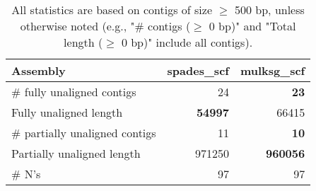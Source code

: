 \documentclass[12pt,a4paper]{article}
\begin{document}
\begin{table}[ht]
\begin{center}
\caption{All statistics are based on contigs of size $\geq$ 500 bp, unless otherwise noted (e.g., "\# contigs ($\geq$ 0 bp)" and "Total length ($\geq$ 0 bp)" include all contigs).}
\begin{tabular}{|l*{2}{|r}|}
\hline
Assembly & spades\_scf & mulksg\_scf \\ \hline
\# fully unaligned contigs & 24 & {\bf 23} \\ \hline
Fully unaligned length & {\bf 54997} & 66415 \\ \hline
\# partially unaligned contigs & 11 & {\bf 10} \\ \hline
Partially unaligned length & 971250 & {\bf 960056} \\ \hline
\# N's & 97 & 97 \\ \hline
\end{tabular}
\end{center}
\end{table}
\end{document}

